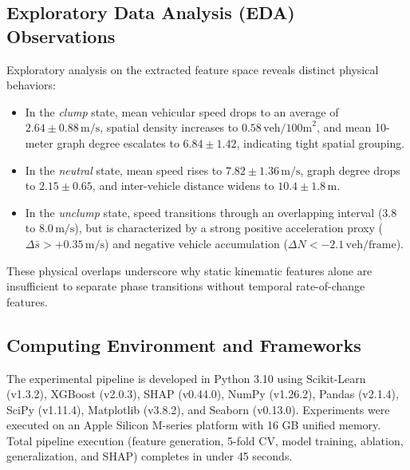 \documentclass[conference]{IEEEtran}
\begin{document}
\subsection{Exploratory Data Analysis (EDA) Observations}
Exploratory analysis on the extracted feature space reveals distinct physical behaviors:
\begin{itemize}
    \item In the \textit{clump} state, mean vehicular speed drops to an average of $2.64 \pm 0.88\,\text{m/s}$, spatial density increases to $0.58\,\text{veh/100m}^2$, and mean 10-meter graph degree escalates to $6.84 \pm 1.42$, indicating tight spatial grouping.
    \item In the \textit{neutral} state, mean speed rises to $7.82 \pm 1.36\,\text{m/s}$, graph degree drops to $2.15 \pm 0.65$, and inter-vehicle distance widens to $10.4 \pm 1.8\,\text{m}$.
    \item In the \textit{unclump} state, speed transitions through an overlapping interval ($3.8$ to $8.0\,\text{m/s}$), but is characterized by a strong positive acceleration proxy ($\Delta \bar{s} > +0.35\,\text{m/s}$) and negative vehicle accumulation ($\Delta N < -2.1\,\text{veh/frame}$).
\end{itemize}
These physical overlaps underscore why static kinematic features alone are insufficient to separate phase transitions without temporal rate-of-change features.

\subsection{Computing Environment and Frameworks}
The experimental pipeline is developed in Python 3.10 using Scikit-Learn (v1.3.2), XGBoost (v2.0.3), SHAP (v0.44.0), NumPy (v1.26.2), Pandas (v2.1.4), SciPy (v1.11.4), Matplotlib (v3.8.2), and Seaborn (v0.13.0). Experiments were executed on an Apple Silicon M-series platform with 16 GB unified memory. Total pipeline execution (feature generation, 5-fold CV, model training, ablation, generalization, and SHAP) completes in under 45 seconds.
\end{document}
